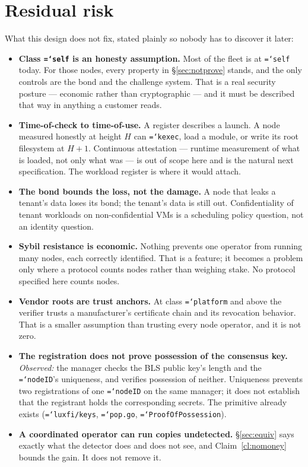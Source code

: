 \documentclass[11pt,a4paper]{article}
\newcommand{\code}[1]{\texttt{\hyphenchar\font=`\-\relax #1}}
\begin{document}
\section{Residual risk}

What this design does not fix, stated plainly so nobody has to discover it later:

\begin{itemize}
\item \textbf{Class \code{self} is an honesty assumption.} Most of the fleet is at
  \code{self} today. For those nodes, every property in \S\ref{sec:notprove}
  stands, and the only controls are the bond and the challenge system. That is a
  real security posture --- economic rather than cryptographic --- and it must be
  described that way in anything a customer reads.
\item \textbf{Time-of-check to time-of-use.} A register describes a launch. A node
  measured honestly at height $H$ can \code{kexec}, load a module, or write its
  root filesystem at $H + 1$. Continuous attestation --- runtime measurement of
  what is loaded, not only what was --- is out of scope here and is the natural
  next specification. The workload register is where it would attach.
\item \textbf{The bond bounds the loss, not the damage.} A node that leaks a
  tenant's data loses its bond; the tenant's data is still out. Confidentiality of
  tenant workloads on non-confidential VMs is a scheduling policy question, not an
  identity question.
\item \textbf{Sybil resistance is economic.} Nothing prevents one operator from
  running many nodes, each correctly identified. That is a feature; it becomes a
  problem only where a protocol counts nodes rather than weighing stake. No
  protocol specified here counts nodes.
\item \textbf{Vendor roots are trust anchors.} At class \code{platform} and above
  the verifier trusts a manufacturer's certificate chain and its revocation
  behavior. That is a smaller assumption than trusting every node operator, and it
  is not zero.
\item \textbf{The registration does not prove possession of the consensus key.}
  \emph{Observed:} the manager checks the BLS public key's length and the
  \code{nodeID}'s uniqueness, and verifies possession of neither. Uniqueness
  prevents two registrations of one \code{nodeID} on the same manager; it does not
  establish that the registrant holds the corresponding secrets. The primitive
  already exists (\code{luxfi/keys}, \code{pop.go}, \code{ProofOfPossession}).
\item \textbf{A coordinated operator can run copies undetected.} \S\ref{sec:equiv}
  says exactly what the detector does and does not see, and
  Claim~\ref{cl:nomoney} bounds the gain. It does not remove it.
\end{itemize}
\end{document}
